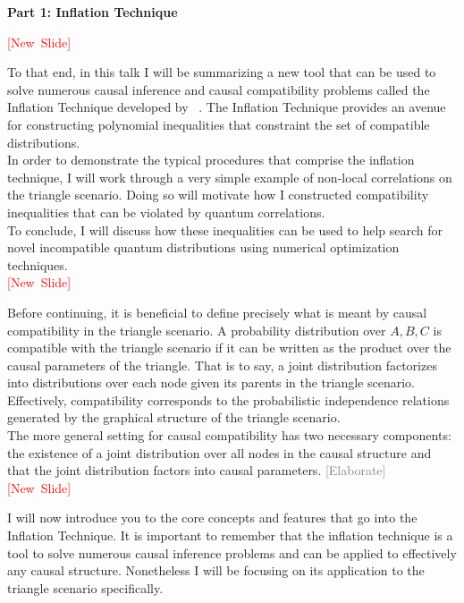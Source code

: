 \documentclass{article}
\newcommand{\newslide}{\textcolor{red}{[New~Slide]}}
\newcommand{\elaborate}{\textcolor{gray}{[Elaborate]}}
\begin{document}
    \begin{center}
        \textbf{Part 1: Inflation Technique}
    \end{center}
    \newslide

    To that end, in this talk I will be summarizing a new tool that can be used to solve numerous causal inference and causal compatibility problems called the Inflation Technique developed by ~\cite{Inflation}. The Inflation Technique provides an avenue for constructing polynomial inequalities that constraint the set of compatible distributions. \\

    In order to demonstrate the typical procedures that comprise the inflation technique, I will work through a very simple example of non-local correlations on the triangle scenario. Doing so will motivate how I constructed compatibility inequalities that can be violated by quantum correlations. \\

    To conclude, I will discuss how these inequalities can be used to help search for novel incompatible quantum distributions using numerical optimization techniques. \\

    \newslide

    Before continuing, it is beneficial to define precisely what is meant by causal compatibility in the triangle scenario. A probability distribution over $A,B,C$ is compatible with the triangle scenario if it can be written as the product over the causal parameters of the triangle. That is to say, a joint distribution factorizes into distributions over each node given its parents in the triangle scenario. Effectively, compatibility corresponds to the probabilistic independence relations generated by the graphical structure of the triangle scenario. \\

    The more general setting for causal compatibility has two necessary components: the existence of a joint distribution over all nodes in the causal structure and that the joint distribution factors into causal parameters. \elaborate\\

    \newslide

    I will now introduce you to the core concepts and features that go into the Inflation Technique. It is important to remember that the inflation technique is a tool to solve numerous causal inference problems and can be applied to effectively any causal structure. Nonetheless I will be focusing on its application to the triangle scenario specifically. \\
\end{document}
